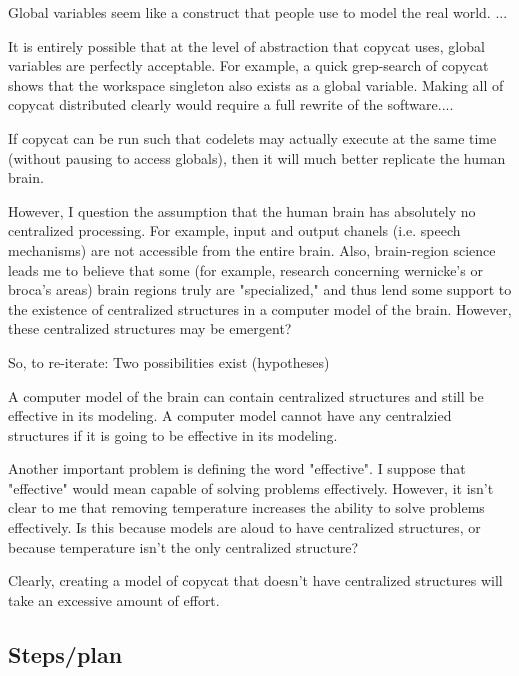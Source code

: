 \documentclass[a4paper]{article}
\begin{document}
    Global variables seem like a construct that people use to model the real world.
    ...

    It is entirely possible that at the level of abstraction that copycat uses, global variables are perfectly acceptable.
    For example, a quick grep-search of copycat shows that the workspace singleton also exists as a global variable.
    Making all of copycat distributed clearly would require a full rewrite of the software....

    If copycat can be run such that codelets may actually execute at the same time (without pausing to access globals), then it will much better replicate the human brain.

    However, I question the assumption that the human brain has absolutely no centralized processing.
    For example, input and output chanels (i.e. speech mechanisms) are not accessible from the entire brain.
    Also, brain-region science leads me to believe that some (for example, research concerning wernicke's or broca's areas) brain regions truly are "specialized," and thus lend some support to the existence of centralized structures in a computer model of the brain.
    However, these centralized structures may be emergent?

    So, to re-iterate: Two possibilities exist (hypotheses)

    A computer model of the brain can contain centralized structures and still be effective in its modeling.
    A computer model cannot have any centralzied structures if it is going to be effective in its modeling.

    Another important problem is defining the word "effective".
    I suppose that "effective" would mean capable of solving problems effectively.
    However, it isn't clear to me that removing temperature increases the ability to solve problems effectively.
    Is this because models are aloud to have centralized structures, or because temperature isn't the only centralized structure?

    Clearly, creating a model of copycat that doesn't have centralized structures will take an excessive amount of effort.
    
\subsection{Steps/plan}
\end{document}

